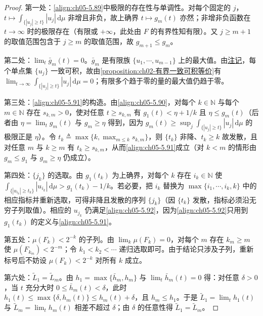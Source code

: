 \documentclass[../../main.tex]{subfiles}
\begin{document}
\begin{proof}
第一处：\eqref{align:ch05-5.89}中极限的存在性与单调性。对每个固定的 $j$，$t\mapsto\int_{\{|u_j|\geqslant t\}}|u_j|\,\mathrm{d}\mu$ 非增且非负，故上确界 $t\mapsto g_m(t)$ 亦然；非增非负函数在 $t\to\infty$ 时的极限存在（有限或 $+\infty$，此处由 $F$ 的有界性知有限）。又 $j\geqslant m+1$ 的取值范围包含于 $j\geqslant m$ 的取值范围，故 $g_{m+1}\leqslant g_m$。

第二处：$\lim_t\bar g_m(t)=0$。$\bar g_m$ 是有限族 $\{u_1,\cdots ,u_{m-1}\}$ 上的最大值。由\hyperref[remark:ch02-单点一致可积]{注记}，每个单点集 $\{u_j\}$ 一致可积，故由\cref{proposition:ch02-有界一致可积等价}有 $\lim_{t\to\infty}\int_{\{|u_j|\geqslant t\}}|u_j|\,\mathrm{d}\mu=0$；有限多个趋于零的量的最大值仍趋于零。

第三处：\eqref{align:ch05-5.91}的构造。由\eqref{align:ch05-5.90}，对每个 $k\in\mathbb{N}$ 与每个 $m\in\mathbb{N}$ 存在 $s_{k,m}>0$，使对任意 $t\geqslant s_{k,m}$ 有 $g_1(t)<\eta+1/k$ 且 $\eta\leqslant g_m(t)$（后者由 $\eta=\lim_tg_m(t)$ 与 $g_m\geqslant\eta$ 得到，因为 $g_m(t)\geqslant\sup_j\int_{\{|u_j|\geqslant t\}}|u_j|\,\mathrm{d}\mu$ 的极限正是 $\eta$）。令 $t_k\triangleq\max\{k,\max_{m\leqslant k}s_{k,m}\}$，则 $\{t_k\}$ 非降、$t_k\geqslant k$ 故发散，且对任意 $m$ 与 $k\geqslant m$ 有 $t_k\geqslant s_{k,m}$，从而\eqref{align:ch05-5.91}成立（对 $k<m$ 的情形由 $g_m\leqslant g_1$ 与 $g_m\geqslant\eta$ 仍成立）。

第四处：$\{j_k\}$ 的选取。由 $g_1(t_k)$ 为上确界，对每个 $k$ 存在 $i_k\in\mathbb{N}$ 使 $\int_{\{|u_{i_k}|\geqslant t_k\}}|u_{i_k}|\,\mathrm{d}\mu>g_1(t_k)-1/k$。若必要，把 $i_k$ 替换为 $\max\{i_1,\cdots ,i_k,k\}$ 中的相应指标并重新选取，可得非降且发散的序列 $\{j_k\}$（因 $\{t_k\}$ 发散，指标必须沿无穷子列取值）。相应的 $u_{j_k}$ 仍满足\eqref{align:ch05-5.92}，因为\eqref{align:ch05-5.92}只用到 $g_1(t_k)$ 的定义与\eqref{align:ch05-5.91}。

第五处：$\mu(F_k)<2^{-k}$ 的子列。由 $\lim_k\mu(F_k)=0$，对每个 $m$ 存在 $k_m\geqslant m$ 使 $\mu(F_{k_m})<2^{-m}$；令 $k_1<k_2<\cdots$ 递归选取即可。由于结论只涉及子列，重新标号后不妨设 $\mu(F_k)<2^{-k}$ 对所有 $k$ 成立。

第六处：$\tilde L_1=\tilde L_m$。由 $h_1=\max\{\bar h_m,h_m\}$ 与 $\lim_t\bar h_m(t)=0$ 得：对任意 $\delta>0$，当 $t$ 充分大时 $0\leqslant\bar h_m(t)<\delta$，此时 $h_1(t)\leqslant\max\{\delta,h_m(t)\}\leqslant h_m(t)+\delta$，且 $h_m\leqslant h_1$。于是 $\tilde L_1=\lim_th_1(t)$ 与 $\tilde L_m=\lim_th_m(t)$ 相差不超过 $\delta$；由 $\delta$ 的任意性得 $\tilde L_1=\tilde L_m$。
\end{proof}
\end{document}
